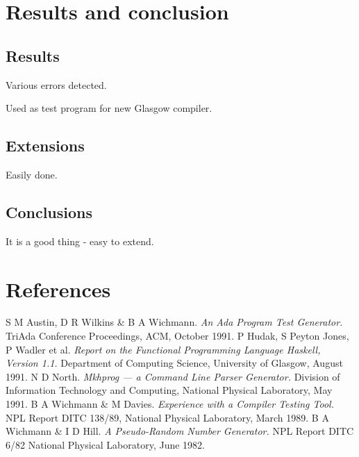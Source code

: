 


\section{Results and conclusion}

\subsection{Results}
Various errors detected.

Used as test program for new Glasgow compiler.

\subsection{Extensions}
Easily done.

\subsection{Conclusions}
It is a good thing  - easy to extend.

\section*{References}

\begin{thebibliography}{North91}
    S M Austin, D R Wilkins \& B A Wichmann.
    {\it An Ada Program Test Generator.}
    TriAda Conference Proceedings, ACM, October 1991.
    P Hudak, S Peyton Jones, P Wadler et al.
    {\it Report on the Functional Programming Language Haskell, Version 1.1.}
    Department of Computing Science, University of Glasgow, August 1991.
    N D North.
    {\it Mkhprog --- a Command Line Parser Generator.}
    Division of Information Technology and Computing, National Physical
    Laboratory, May 1991.
    B A Wichmann \& M Davies.
    {\it Experience with a Compiler Testing Tool.}
    NPL Report DITC 138/89, National Physical Laboratory, March 1989.
    B A Wichmann \& I D Hill.
    {\it A Pseudo-Random Number Generator.}
    NPL Report DITC 6/82 National Physical Laboratory, June 1982.
\end{thebibliography}
